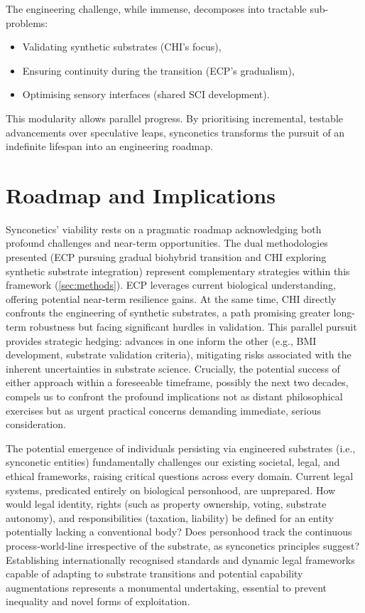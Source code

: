 \documentclass[10pt]{article}
\begin{document}
\begin{sloppypar}
  The engineering challenge, while immense, decomposes into tractable sub-problems:
  \begin{itemize}
    \item Validating synthetic substrates (CHI’s focus),
    \item Ensuring continuity during the transition (ECP’s gradualism),
    \item Optimising sensory interfaces (shared SCI development).
  \end{itemize}

  This modularity allows parallel progress. By prioritising incremental, testable advancements over speculative leaps, synconetics transforms the pursuit of an indefinite lifespan into an engineering roadmap.


  \section{Roadmap and Implications}
  \label{sec:roadmap}

  Synconetics’ viability rests on a pragmatic roadmap acknowledging both profound challenges and near-term opportunities. The dual methodologies presented (ECP pursuing gradual biohybrid transition and CHI exploring synthetic substrate integration) represent complementary strategies within this framework (\autoref{sec:methods}). ECP leverages current biological understanding, offering potential near-term resilience gains. At the same time, CHI directly confronts the engineering of synthetic substrates, a path promising greater long-term robustness but facing significant hurdles in validation. This parallel pursuit provides strategic hedging: advances in one inform the other (e.g., BMI development, substrate validation criteria), mitigating risks associated with the inherent uncertainties in substrate science. Crucially, the potential success of either approach within a foreseeable timeframe, possibly the next two decades, compels us to confront the profound implications not as distant philosophical exercises but as urgent practical concerns demanding immediate, serious consideration.

  The potential emergence of individuals persisting via engineered substrates (i.e., synconetic entities) fundamentally challenges our existing societal, legal, and ethical frameworks, raising critical questions across every domain. Current legal systems, predicated entirely on biological personhood, are unprepared. How would legal identity, rights (such as property ownership, voting, substrate autonomy), and responsibilities (taxation, liability) be defined for an entity potentially lacking a conventional body? Does personhood track the continuous process-world-line irrespective of the substrate, as synconetics principles suggest? Establishing internationally recognised standards and dynamic legal frameworks capable of adapting to substrate transitions and potential capability augmentations represents a monumental undertaking, essential to prevent inequality and novel forms of exploitation.


\end{sloppypar}
\end{document}

